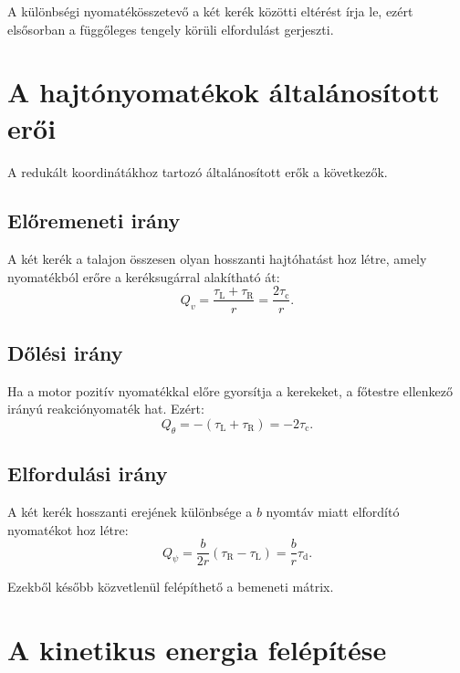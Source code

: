 \documentclass[12pt,a4paper]{article}
\newcommand{\tauL}{\tau_{\mathrm{L}}}
\newcommand{\tauR}{\tau_{\mathrm{R}}}
\newcommand{\tauc}{\tau_{\mathrm{c}}}
\newcommand{\taud}{\tau_{\mathrm{d}}}
\begin{document}
	A különbségi nyomatékösszetevő a két kerék közötti eltérést írja le, ezért elsősorban a függőleges tengely körüli elfordulást gerjeszti.
	
	\section{A hajtónyomatékok általánosított erői}
	
	A redukált koordinátákhoz tartozó általánosított erők a következők.
	
	\subsection{Előremeneti irány}
	
	A két kerék a talajon összesen olyan hosszanti hajtóhatást hoz létre, amely nyomatékból erőre a keréksugárral alakítható át:
	\begin{equation}
		Q_v=\frac{\tauL+\tauR}{r}
		=\frac{2\tauc}{r}.
	\end{equation}
	
	\subsection{Dőlési irány}
	
	Ha a motor pozitív nyomatékkal előre gyorsítja a kerekeket, a főtestre ellenkező irányú reakciónyomaték hat. Ezért:
	\begin{equation}
		Q_\theta=-(\tauL+\tauR)=-2\tauc.
	\end{equation}
	
	\subsection{Elfordulási irány}
	
	A két kerék hosszanti erejének különbsége a $b$ nyomtáv miatt elfordító nyomatékot hoz létre:
	\begin{equation}
		Q_\psi=\frac{b}{2r}(\tauR-\tauL)
		=\frac{b}{r}\taud.
	\end{equation}
	
	Ezekből később közvetlenül felépíthető a bemeneti mátrix.
	
	\section{A kinetikus energia felépítése}
	
\end{document}
